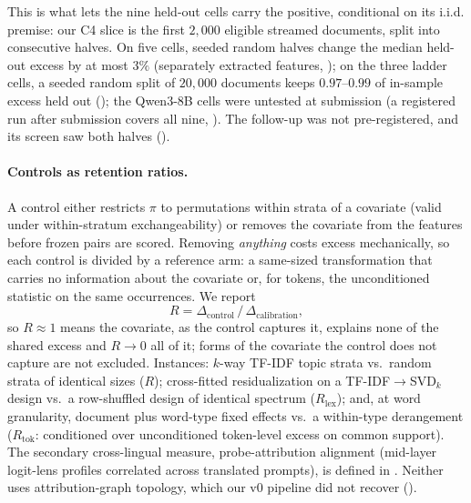 This is what lets the nine held-out cells carry the positive, conditional on its i.i.d. premise:
our C4 slice is the first $2{,}000$ eligible streamed documents, split into consecutive halves. On five
cells, seeded random halves change the median held-out excess by at most $3\%$ (separately extracted features,
); on the three ladder cells, a seeded random split of $20{,}000$ documents keeps
$0.97$--$0.99$ of in-sample excess held out (); the Qwen3-8B cells were untested at
submission (a registered run after submission covers all nine, ). The follow-up was not
pre-registered, and its screen saw both halves ().

\paragraph{Controls as retention ratios.} A control either restricts $\pi$ to permutations
within strata of a covariate (valid under within-stratum exchangeability) or removes the
covariate from the features before frozen pairs are scored. Removing \emph{anything} costs excess
mechanically, so each control is divided by a reference arm: a same-sized transformation that
carries no information about the covariate or, for tokens, the unconditioned statistic on the
same occurrences. We report
\begin{equation}\label{eq:ratio}
R=\Delta_{\text{control}}\,/\,\Delta_{\text{calibration}},
\end{equation}
so $R\approx1$ means the covariate, as the control captures it, explains none of the shared
excess and $R\to0$ all of it; forms of the covariate the control does not capture are not excluded.
Instances: $k$-way TF-IDF topic strata vs.\ random strata of identical sizes ($R$);
cross-fitted residualization on a TF-IDF$\to$SVD$_k$ design vs.\ a row-shuffled design of
identical spectrum ($R_{\text{lex}}$); and, at word granularity, document plus word-type fixed
effects vs.\ a within-type derangement ($R_{\text{tok}}$: conditioned over unconditioned
token-level excess on common support). The secondary cross-lingual measure, probe-attribution
alignment (mid-layer logit-lens profiles correlated across translated prompts), is defined in
. Neither uses attribution-graph topology, which our v0
pipeline did not recover ().
